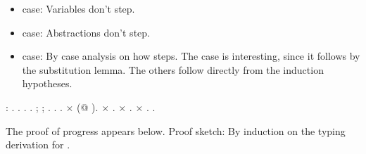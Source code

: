 \documentclass[12pt]{report}
\begin{document}
\begin{itemize}
\item  {} case: Variables don't step.



\item  {} case: Abstractions don't step.



\item  {} case: By case analysis on how  steps. The
         case is interesting, since it follows by the
        substitution lemma.  The others follow directly from the
        induction hypotheses. 
\end{itemize}
\begin{coqdoccode}
\coqdocemptyline
\coqdocnoindent
{}  : .\coqdoceol
\coqdocnoindent
{}.\coqdoceol
\coqdocindent{1.00em}
 .  .\coqdoceol
\coqdocindent{1.00em}
 ;   ;  .\coqdoceol
\coqdocindent{1.00em}
 .  . \ensuremath{\times} (@ ).\coqdoceol
\coqdocindent{1.50em}
\ensuremath{\times} .\coqdoceol
\coqdocindent{1.00em}
\ensuremath{\times} .\coqdoceol
\coqdocindent{1.00em}
\ensuremath{\times} .\coqdoceol
\coqdocnoindent
{}.\coqdoceol
\coqdocemptyline
\end{coqdoccode}
The proof of progress appears below.
    Proof sketch: By induction on the typing derivation for .
\end{document}
